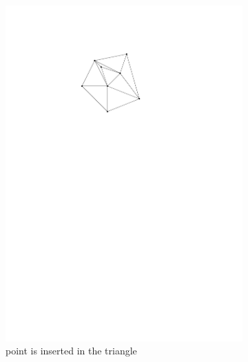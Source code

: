 \begin{figure}[h]
    \centering
    \begin{subfigure}[t]{0.5\textwidth}
        \centering
        \includegraphics{images/law_flip_a.pdf}
        \caption{point is inserted in the triangle}
    \end{subfigure}%
    \begin{subfigure}[t]{0.5\textwidth}
        \centering

\end{subfigure}
\end{figure}
